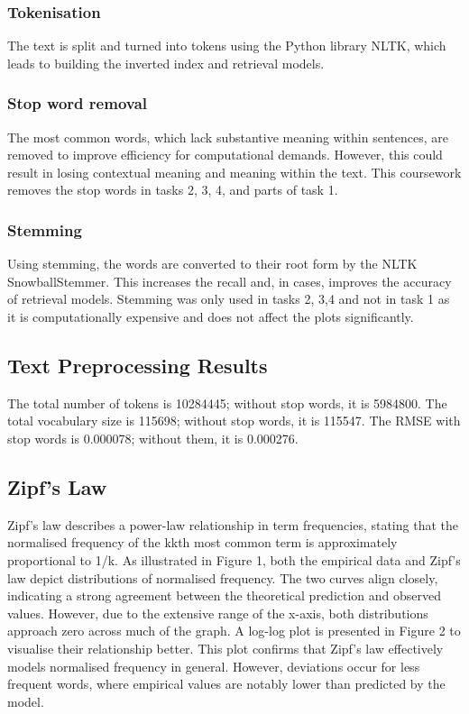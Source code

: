 \documentclass[10pt]{article}
\begin{document}
\subsubsection{Tokenisation}
The text is split and turned into tokens using the Python library NLTK, which leads to building the inverted index and retrieval models.

\subsubsection{Stop word removal}
The most common words, which lack substantive meaning within sentences, are removed to improve efficiency for computational demands. However, this could result in losing contextual meaning and meaning within the text. This coursework removes the stop words in tasks 2, 3, 4, and parts of task 1.

\subsubsection{Stemming}
Using stemming, the words are converted to their root form by the NLTK SnowballStemmer. This increases the recall and, in cases, improves the accuracy of retrieval models. Stemming was only used in tasks 2, 3,4 and not in task 1 as it is computationally expensive and does not affect the plots significantly.

\subsection{Text Preprocessing Results}
The total number of tokens is 10284445; without stop words, it is 5984800. The total vocabulary size is 115698; without stop words, it is 115547. The RMSE with stop words is 0.000078; without them, it is 0.000276.

\subsection{Zipf’s Law}
Zipf’s law describes a power-law relationship in term frequencies, stating that the normalised frequency of the kkth most common term is approximately proportional to 1/k.
As illustrated in Figure 1, both the empirical data and Zipf’s law depict distributions of normalised frequency. The two curves align closely, indicating a strong agreement between the theoretical prediction and observed values. However, due to the extensive range of the x-axis, both distributions approach zero across much of the graph. A log-log plot is presented in Figure 2 to visualise their relationship better. This plot confirms that Zipf’s law effectively models normalised frequency in general. However, deviations occur for less frequent words, where empirical values are notably lower than predicted by the model.
\end{document}
